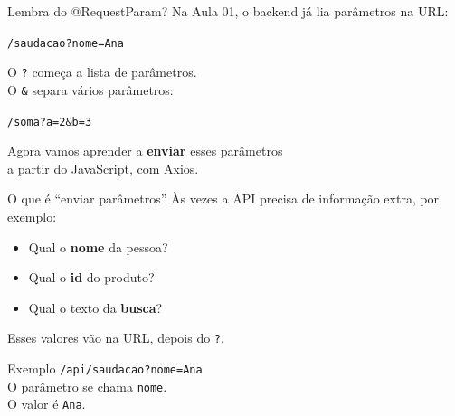 \documentclass[aspectratio=169,11pt]{beamer}
\begin{document}
\begin{frame}{Lembra do @RequestParam?}
  Na Aula 01, o backend já lia parâmetros na URL:

  \vspace{0.4em}
  \begin{center}
    \texttt{/saudacao?nome=Ana}
  \end{center}

  \vspace{0.6em}
  O \texttt{?} começa a lista de parâmetros.\\
  O \texttt{\&} separa vários parâmetros:

  \vspace{0.4em}
  \begin{center}
    \texttt{/soma?a=2\&b=3}
  \end{center}

  \vspace{0.6em}
  Agora vamos aprender a \textbf{enviar} esses parâmetros\\
  a partir do JavaScript, com Axios.
\end{frame}

\begin{frame}{O que é ``enviar parâmetros''}
  Às vezes a API precisa de informação extra, por exemplo:

  \vspace{0.5em}
  \begin{itemize}
    \item Qual o \textbf{nome} da pessoa?
    \item Qual o \textbf{id} do produto?
    \item Qual o texto da \textbf{busca}?
  \end{itemize}

  \vspace{0.6em}
  Esses valores vão na URL, depois do \texttt{?}.

  \vspace{0.5em}
  \begin{block}{Exemplo}
    \texttt{/api/saudacao?nome=Ana}\\
    O parâmetro se chama \texttt{nome}.\\
    O valor é \texttt{Ana}.
  \end{block}
\end{frame}
\end{document}
